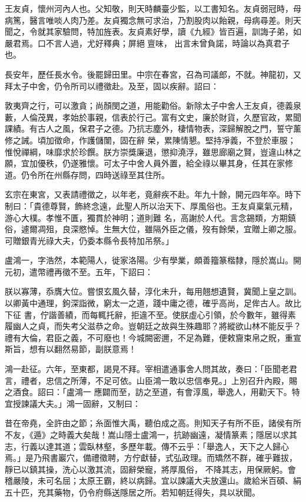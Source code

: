 \begin{pinyinscope}
 王友貞，懷州河內人也。父知敬，則天時麟臺少監，以工書知名。友貞弱冠時，母病篤，醫言唯啖人肉乃差。友貞獨念無可求治，乃割股肉以飴親，母病尋差。則天聞之，令就其家驗問，特加旌表。友貞素好學，讀《九經》皆百遍，訓誨子弟，如嚴君焉。口不言人過，尤好釋典；屏絕亶味，
 出言未曾負諾，時論以為真君子也。



 長安年，歷任長水令。後罷歸田里。中宗在春宮，召為司議郎，不就。神龍初，又拜太子中舍，仍令所司以禮徵赴。及至，固以疾辭。詔曰：



 敦夷齊之行，可以激貪；尚顏閔之道，用能勸俗。新除太子中舍人王友貞，德義泉藪，人倫茂異，孝始於事親，信表於行己。富有文史，廉於財貨，久歷官政，累聞課績。有古人之風，保君子之德。乃抗志塵外，棲情物表，深歸解脫之門，誓守薰修之誡。頃加徵命，作護儲闈，固在辭
 榮，累陳情懇。堅持凈義，不登於車服；惟悅禪綱，味靡求於珍饌。朕方崇獎廉退，懲抑澆浮，雖思廊廟之賢，豈違山林之願，宜加優秩，仍遂雅懷。可太子中舍人員外置，給全祿以畢其身，任其在家修道。仍令所在州縣存問，四時送祿至其住所。



 玄宗在東宮，又表請禮徵之，以年老，竟辭疾不赴。年九十餘，開元四年卒。時下制曰：「貴德尊賢，飾終念遠，此聖人所以治天下、厚風俗也。王友貞稟氣元精，游心大樸。孝惟不匱，獨貫於神明；道則難
 名，高謝於人代。言念錫類，方期鎮俗，遽爾凋殂，良深愍悼。生無大位，雖隔外臣之儀，歿有餘榮，宜贈上卿之服。可贈銀青光祿大夫，仍委本縣令長特加吊祭。」



 盧鴻一，字浩然，本範陽人，徙家洛陽。少有學業，頗善籀篆楷隸，隱於嵩山。開元初，遣幣禮再徵不至。五年，下詔曰：



 朕以寡薄，忝膺大位。嘗恨玄風久替，淳化未升，每用翹想遺賢，冀聞上皇之訓。以卿黃中通理，鉤深詣微，窮太一之道，踐中庸之德，確乎高尚，足侔古人。故比下征
 書，佇諧善績，而每輒托辭，拒違不至。使朕虛心引領，於今數年，雖得素履幽人之貞，而失考父滋恭之命。豈朝廷之故與生殊趣耶？將縱欲山林不能反乎？禮有大倫，君臣之義，不可廢也！今城闕密邇，不足為難，便敕齎束帛之貺，重宣斯旨，想有以翻然易節，副朕意焉！



 鴻一赴征。六年，至東都，謁見不拜。宰相遣通事舍人問其故，奏曰：「臣聞老君言，禮者，忠信之所薄，不足可依。山臣鴻一敢以忠信奉見。」上別召升內殿，賜之酒食。詔曰：「盧鴻一
 應闢而至，訪之至道，有會淳風，舉逸人，用勸天下。特宜授諫議大夫。」鴻一固辭，又制曰：



 昔在帝堯，全許由之節；糸面惟大禹，聽伯成之高。則知天子有所不臣，諸侯有所不友，《遁》之時義大矣哉！嵩山隱士盧鴻一，抗跡幽遠，凝情篆素；隱居以求其志，行義以達其道；雲臥林壑，多歷年載。傳不云乎：「舉逸人，天下之人歸心焉。」是乃飛書巖穴，備禮徵聘，方佇獻替，式弘政理。而矯然不群，確乎難拔，靜已以鎮其操，洗心以激其流，固辭榮寵，將厚風俗，
 不降其志，用保厥躬。會稽嚴陵，未可名屈；太原王霸，終以病歸。宜以諫議大夫放還山。歲給米百碩、絹五十匹，充其藥物，仍令府縣送隱居之所。若知朝廷得失，具以狀聞。




\end{pinyinscope}
